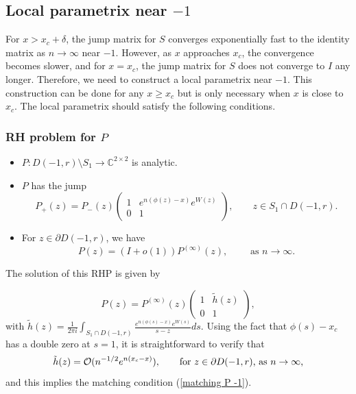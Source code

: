 \documentclass[11pt,fleqn]{article}
\numberwithin{equation}{section}
\def\bigO{{\cal O}}
\begin{document}
\subsection{Local parametrix near $-1$}
For $x>x_c+\delta$, the jump matrix for $S$ converges exponentially fast to the identity matrix as $n\to\infty$ near  $-1$. However, as $x$ approaches $x_c$, the convergence becomes slower, and for $x=x_c$, the jump matrix for $S$ does not converge to $I$ any longer. Therefore, we need to construct a local parametrix near $-1$. This construction can be done for any $x\geq x_c$ but is only necessary when $x$ is close to $x_c$. The local parametrix should satisfy the following conditions.
\subsubsection*{RH problem for $P$}
\begin{itemize}
\item[(a)] $P : D(-1,r)\setminus S_{1} \to \mathbb{C}^{2\times 2}$ is analytic.
\item[(b)] $P$ has the jump
\begin{equation}
P_+(z)=P_-(z)\begin{pmatrix}1 & e^{n(\phi(z)-x)}e^{W(z)}\\0 &1
\end{pmatrix}, \qquad z\in S_{1}\cap D(-1,r).
\end{equation}
\item[(c)] For $z\in\partial D(-1,r)$, we have
\begin{equation}
\label{matching P -1}P(z) = (I + o(1))P^{(\infty)}(z),\qquad \mbox{ as $n \to \infty$.}
\end{equation}
\end{itemize}

The solution of this RHP is given by

\begin{equation}\label{P-1}
P(z) = P^{(\infty)}(z) \begin{pmatrix}
1 & \tilde{h}(z) \\ 0 & 1
\end{pmatrix},
\end{equation}
with $\displaystyle \tilde{h}(z) = \frac{1}{2\pi i} \int_{S_{1}\cap D(-1,r)} \frac{e^{n(\phi(s)-x)}e^{W(s)}}{s-z}ds$.
Using the fact that $\phi(s)-x_c$ has a double zero at $s=1$, it is straightforward to verify that
\begin{equation}
\tilde{h}(z)=\bigO(n^{-1/2}e^{n(x_c-x)}),\qquad\mbox{for $z\in \partial D(-1,r)$, as $n\to\infty$,}
\end{equation}
and this implies the matching condition (\ref{matching P -1}).
\end{document}
